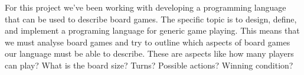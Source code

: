 For this project we've been working with developing a programming language that can be used to describe board games. The specific topic is to design, define, and implement a programing language for generic game playing. This means that we must analyse board games and try to outline which aspects of board games our language must be able to describe. These are aspects like how many players can play? What is the board size? Turns? Possible actions? Winning condition?

